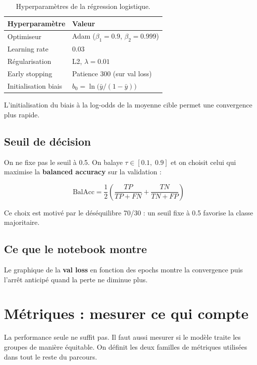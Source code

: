 \documentclass[11pt, a4paper]{article}
\begin{document}
\begin{table}[H]
\centering
\begin{tabular}{ll}
\toprule
\textbf{Hyperparamètre} & \textbf{Valeur} \\
\midrule
Optimiseur & Adam ($\beta_1=0.9$, $\beta_2=0.999$) \\
Learning rate & 0.03 \\
R\'{e}gularisation & L2, $\lambda = 0.01$ \\
Early stopping & Patience 300 (sur val loss) \\
Initialisation biais & $b_0 = \ln\!\big(\bar{y} / (1-\bar{y})\big)$ \\
\bottomrule
\end{tabular}
\caption{Hyperparamètres de la r\'{e}gression logistique.}
\end{table}

L'initialisation du biais \`{a} la log-odds de la moyenne cible permet une convergence plus rapide.

\subsection{Seuil de d\'{e}cision}

On ne fixe pas le seuil \`{a} 0.5. On balaye $\tau \in [0.1,\; 0.9]$ et on choisit celui qui maximise la \textbf{balanced accuracy} sur la validation :

$$\text{BalAcc} = \frac{1}{2}\left(\frac{TP}{TP+FN} + \frac{TN}{TN+FP}\right)$$

Ce choix est motiv\'{e} par le d\'{e}s\'{e}quilibre 70/30 : un seuil fixe \`{a} 0.5 favorise la classe majoritaire.

\subsection{Ce que le notebook montre}

Le graphique de la \textbf{val loss} en fonction des epochs montre la convergence puis l'arr\^{e}t anticip\'{e} quand la perte ne diminue plus.

\section{M\'{e}triques : mesurer ce qui compte}
\label{sec:metrics}

\begin{questionbox}
La performance seule ne suffit pas. Il faut aussi mesurer si le mod\`{e}le traite les groupes de mani\`{e}re \'{e}quitable. On d\'{e}finit les deux familles de m\'{e}triques utilis\'{e}es dans tout le reste du parcours.
\end{questionbox}
\end{document}
